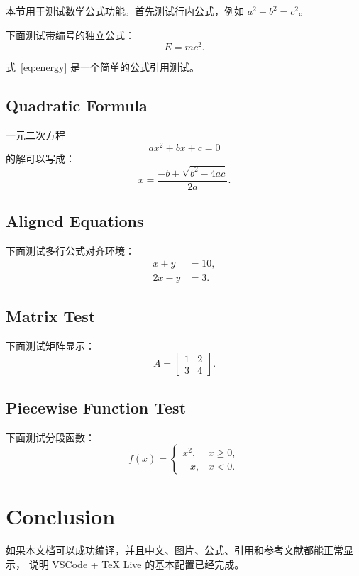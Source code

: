 \documentclass{article}
\begin{document}
本节用于测试数学公式功能。首先测试行内公式，例如 $a^2 + b^2 = c^2$。

下面测试带编号的独立公式：
\begin{equation}
	E = mc^2 .
	\label{eq:energy}
\end{equation}

式~\eqref{eq:energy} 是一个简单的公式引用测试。

\subsection{Quadratic Formula}

一元二次方程
\begin{equation}
	ax^2 + bx + c = 0
\end{equation}
的解可以写成：
\begin{equation}
	x = \frac{-b \pm \sqrt{b^2 - 4ac}}{2a}.
	\label{eq:quadratic}
\end{equation}

\subsection{Aligned Equations}

下面测试多行公式对齐环境：
\begin{align}
	x + y &= 10, \\
	2x - y &= 3.
\end{align}

\subsection{Matrix Test}

下面测试矩阵显示：
\begin{equation}
	A =
	\begin{bmatrix}
		1 & 2 \\
		3 & 4
	\end{bmatrix}.
\end{equation}

\subsection{Piecewise Function Test}

下面测试分段函数：
\begin{equation}
	f(x) =
	\begin{cases}
		x^2, & x \geq 0, \\
		-x,  & x < 0.
	\end{cases}
\end{equation}

\section{Conclusion}

如果本文档可以成功编译，并且中文、图片、公式、引用和参考文献都能正常显示，
说明 VSCode + TeX Live 的基本配置已经完成。


\end{document}
